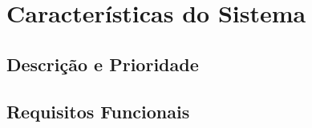\chapter{Características do Sistema}

\section{Descrição e Prioridade}

\section{Requisitos Funcionais}